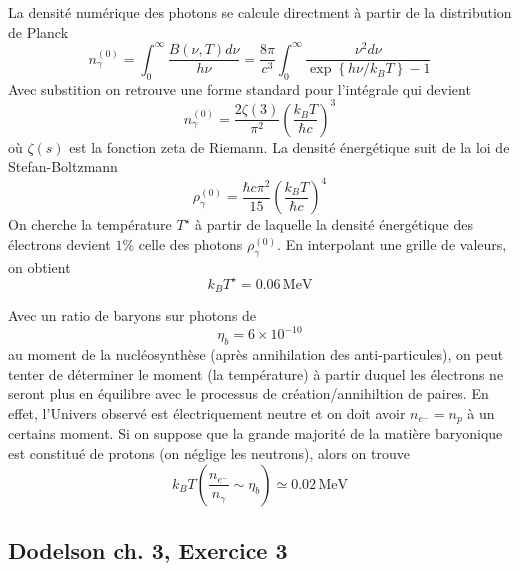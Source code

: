 \documentclass{article}
\numberwithin{equation}{section}
\begin{document}
La densité numérique des photons se calcule directment à partir de la distribution 
de Planck
\begin{equation}\label{eq:PlanckDensity} 
        n_\gamma^{(0)} = \int_0^{\infty}\frac{B(\nu, T) d\nu}{h\nu} = 
        \frac{8 \pi }{c^3}  \int_0^{\infty } 
        \frac{\nu^2 d\nu}{\exp \left\{ h\nu / k_B T \right\} - 1}
\end{equation} 
Avec substition on retrouve une forme standard pour l'intégrale qui devient
\[
        n_\gamma^{(0)} = \frac{2\zeta(3 )}{\pi^2} \left( \frac{k_B T}{\hbar c} \right)^{3}
\]
où $\zeta(s)$ est la fonction zeta de Riemann.
La densité énergétique suit de la loi de Stefan-Boltzmann
\[
        \rho_\gamma^{(0)} = \frac{\hbar c\pi^2}{15} \left( \frac{k_B T}{\hbar c} \right)^{4}
\]
On cherche la température $T^\star$ à partir de laquelle la densité énergétique
des électrons 
devient $1\%$ celle des photons $\rho_\gamma^{(0)}$. En interpolant une grille de valeurs, 
on obtient
\[
        \boxed{k_BT^\star = 0.06\, \text{MeV}}
\]

Avec un ratio de baryons sur photons de
\[
        \eta_b = 6 \times 10^{-10}
\]
au moment de la nucléosynthèse (après annihilation des anti-particules), on peut 
tenter de déterminer le moment (la température) à partir duquel les électrons 
ne seront plus en équilibre avec le processus de création/annihiltion de paires. En 
effet, l'Univers observé est électriquement neutre et on doit avoir $n_{e^{-}} = n_p$ 
à un certains moment. Si on suppose que la grande majorité de la matière baryonique 
est constitué de protons (on néglige les neutrons), alors on trouve
\[
        \boxed{k_B T( \frac{n_{e^{-}}}{n_\gamma} \sim \eta_b) \simeq 0.02\, \text{MeV}}
\]

\subsection{Dodelson ch. 3, Exercice 3}
\end{document}
